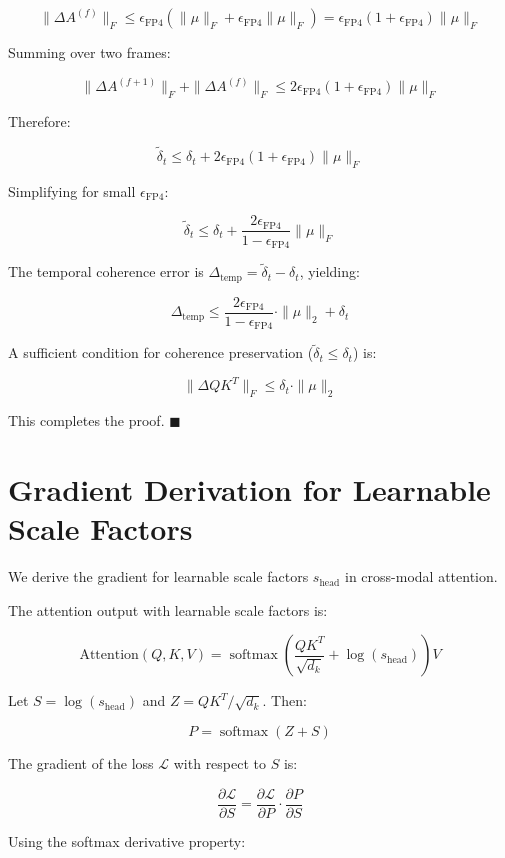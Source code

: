 \documentclass[journal]{IEEEtran}
\theoremstyle{definition}
\theoremstyle{remark}
\DeclareMathOperator{\softmax}{softmax}
\begin{document}
\[
\|\Delta A^{(f)}\|_F \leq \epsilon_{\text{FP4}} (\|\mu\|_F + \epsilon_{\text{FP4}} \|\mu\|_F) = \epsilon_{\text{FP4}}(1 + \epsilon_{\text{FP4}}) \|\mu\|_F
\]

Summing over two frames:

\[
\|\Delta A^{(f+1)}\|_F + \|\Delta A^{(f)}\|_F \leq 2\epsilon_{\text{FP4}}(1 + \epsilon_{\text{FP4}}) \|\mu\|_F
\]

Therefore:

\[
\tilde{\delta}_t \leq \delta_t + 2\epsilon_{\text{FP4}}(1 + \epsilon_{\text{FP4}}) \|\mu\|_F
\]

Simplifying for small $\epsilon_{\text{FP4}}$:

\[
\tilde{\delta}_t \leq \delta_t + \frac{2\epsilon_{\text{FP4}}}{1 - \epsilon_{\text{FP4}}} \|\mu\|_F
\]

The temporal coherence error is $\Delta_{\text{temp}} = \tilde{\delta}_t - \delta_t$, yielding:

\[
\Delta_{\text{temp}} \leq \frac{2\epsilon_{\text{FP4}}}{1 - \epsilon_{\text{FP4}}} \cdot \|\mu\|_2 + \delta_t
\]

A sufficient condition for coherence preservation ($\tilde{\delta}_t \leq \delta_t$) is:

\[
\|\Delta Q K^T\|_F \leq \delta_t \cdot \|\mu\|_2
\]

This completes the proof. \hfill $\blacksquare$

\section{Gradient Derivation for Learnable Scale Factors}
\label{app:c}

We derive the gradient for learnable scale factors $s_{\text{head}}$ in cross-modal attention.

The attention output with learnable scale factors is:

\[
\text{Attention}(Q, K, V) = \softmax\left( \frac{Q K^T}{\sqrt{d_k}} + \log(s_{\text{head}}) \right) V
\]

Let $S = \log(s_{\text{head}})$ and $Z = QK^T / \sqrt{d_k}$. Then:

\[
P = \softmax(Z + S)
\]

The gradient of the loss $\mathcal{L}$ with respect to $S$ is:

\[
\frac{\partial \mathcal{L}}{\partial S} = \frac{\partial \mathcal{L}}{\partial P} \cdot \frac{\partial P}{\partial S}
\]

Using the softmax derivative property:
\end{document}
